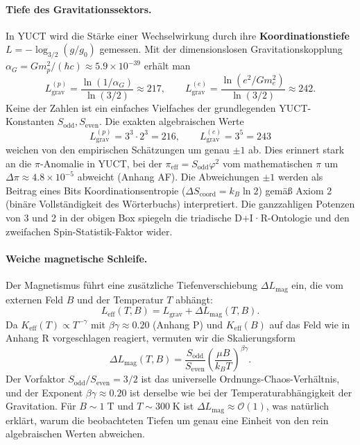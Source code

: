 \documentclass[12pt]{article}
\theoremstyle{remark}
\begin{document}
	\paragraph{Tiefe des Gravitationssektors.}
	In YUCT wird die Stärke einer Wechselwirkung durch ihre \textbf{Koordinationstiefe}
	$L = -\log_{3/2}(g/g_0)$ gemessen. Mit der dimensionslosen Gravitationskopplung
	$\alpha_G = G m_p^2/(\hbar c) \approx 5.9\times10^{-39}$ erhält man
	\begin{equation}
		L_{\mathrm{grav}}^{(p)} = \frac{\ln(1/\alpha_G)}{\ln(3/2)} \approx 217,
		\qquad
		L_{\mathrm{grav}}^{(e)} = \frac{\ln(e^2/G m_e^2)}{\ln(3/2)} \approx 242.
	\end{equation}
	Keine der Zahlen ist ein einfaches Vielfaches der grundlegenden YUCT-Konstanten $S_{\mathrm{odd}}, S_{\mathrm{even}}$.
	Die exakten algebraischen Werte
	\begin{equation}
		\boxed{L_{\mathrm{grav}}^{(p)} = 3^3 \cdot 2^3 = 216},
		\qquad
		\boxed{L_{\mathrm{grav}}^{(e)} = 3^5 = 243}
	\end{equation}
	weichen von den empirischen Schätzungen um genau $\pm1$ ab.  
	Dies erinnert stark an die $\pi$-Anomalie in YUCT, bei der
	$\pi_{\mathrm{eff}} = S_{\mathrm{odd}}\varphi^2$ vom mathematischen $\pi$ um
	$\Delta\pi \approx 4.8\times10^{-5}$ abweicht (Anhang AF).  
	Die Abweichungen $\pm1$ werden als Beitrag eines Bits Koordinationsentropie
	($\Delta S_{\mathrm{coord}} = k_B \ln 2$) gemäß Axiom 2 (binäre Vollständigkeit
	des Wörterbuchs) interpretiert.  Die ganzzahligen Potenzen von 3 und 2 in der obigen Box spiegeln die
	triadische D+I·R-Ontologie und den zweifachen Spin-Statistik-Faktor wider.
	
	\paragraph{Weiche magnetische Schleife.}
	Der Magnetismus führt eine zusätzliche Tiefenverschiebung $\Delta L_{\mathrm{mag}}$ ein, die
	vom externen Feld $B$ und der Temperatur $T$ abhängt:
	\begin{equation}
		L_{\mathrm{eff}}(T,B) = L_{\mathrm{grav}} + \Delta L_{\mathrm{mag}}(T,B).
	\end{equation}
	Da $K_{\mathrm{eff}}(T) \propto T^{-\gamma}$ mit $\beta\gamma \approx 0.20$
	(Anhang P) und $K_{\mathrm{eff}}(B)$ auf das Feld wie in Anhang R vorgeschlagen reagiert,
	vermuten wir die Skalierungsform
	\begin{equation}
		\boxed{
			\Delta L_{\mathrm{mag}}(T,B) =
			\frac{S_{\mathrm{odd}}}{S_{\mathrm{even}}}
			\left( \frac{\mu B}{k_B T} \right)^{\beta\gamma}
		}.
		\label{eq:soft-loop}
	\end{equation}
	Der Vorfaktor $S_{\mathrm{odd}}/S_{\mathrm{even}} = 3/2$ ist das universelle Ordnungs-Chaos-Verhältnis,
	und der Exponent $\beta\gamma \approx 0.20$ ist derselbe wie bei der Temperaturabhängigkeit der Gravitation.
	Für $B \sim 1\;\mathrm{T}$ und $T \sim 300\;\mathrm{K}$ ist $\Delta L_{\mathrm{mag}} \approx \mathcal{O}(1)$,
	was natürlich erklärt, warum die beobachteten Tiefen um genau eine Einheit von den rein algebraischen Werten abweichen.
	
\end{document}
